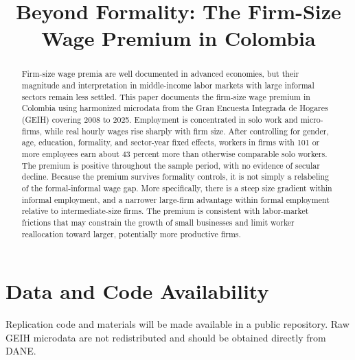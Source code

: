 \documentclass[12pt]{article}
\title{Beyond Formality: The Firm-Size Wage Premium in Colombia}
\author{}
\date{}
\begin{document}
\maketitle

\begin{abstract}
Firm-size wage premia are well documented in advanced economies, but their magnitude and interpretation in middle-income labor markets with large informal sectors remain less settled. This paper documents the firm-size wage premium in Colombia using harmonized microdata from the Gran Encuesta Integrada de Hogares (GEIH) covering 2008 to 2025. Employment is concentrated in solo work and micro-firms, while real hourly wages rise sharply with firm size. After controlling for gender, age, education, formality, and sector-year fixed effects, workers in firms with 101 or more employees earn about 43 percent more than otherwise comparable solo workers. The premium is positive throughout the sample period, with no evidence of secular decline. Because the premium survives formality controls, it is not simply a relabeling of the formal-informal wage gap. More specifically, there is a steep size gradient within informal employment, and a narrower large-firm advantage within formal employment relative to intermediate-size firms. The premium is consistent with labor-market frictions that may constrain the growth of small businesses and limit worker reallocation toward larger, potentially more productive firms.
\end{abstract}










\appendix


\section*{Data and Code Availability}

Replication code and materials will be made available in a public repository. Raw GEIH microdata are not redistributed and should be obtained directly from DANE.



\end{document}
